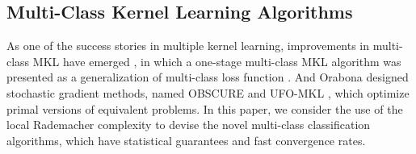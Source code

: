 \documentclass{article}
\begin{document}
\subsection{Multi-Class Kernel Learning Algorithms}
As one of the success stories in multiple kernel learning, improvements in multi-class MKL have emerged \cite{ZienO2007},
in which a one-stage multi-class MKL algorithm was presented as a generalization of multi-class loss function \cite{CrammerS02,TsochantaridisHJA04}.
And Orabona designed stochastic gradient methods, named
OBSCURE \cite{OrabonaJC10} and
UFO-MKL \cite{OrabonaL11}, which optimize primal versions of equivalent problems.
In this paper, we consider the use of  the local Rademacher complexity to devise the novel  multi-class classification
algorithms, which have statistical guarantees and fast convergence rates.
\end{document}
